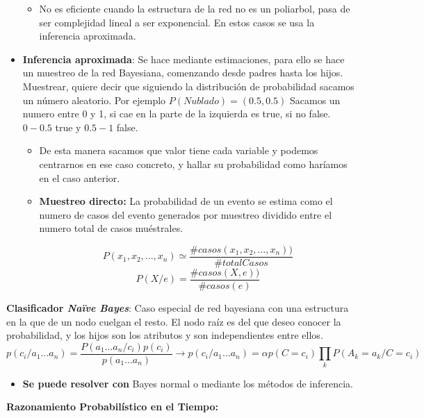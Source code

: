\documentclass[12pt, twoside, openright]{report} %
\begin{document}
\begin{itemize}
\begin{itemize}
    \item No es eficiente cuando la estructura de la red no es un poliarbol,
      pasa de ser complejidad lineal a ser exponencial. En estos casos
      se usa la inferencia aproximada.
      
    \end{itemize}
  \item \textbf{Inferencia aproximada}: Se hace mediante estimaciones, para
    ello se hace un muestreo de la red Bayesiana, comenzando desde
    padres hasta los hijos. Muestrear, quiere decir que siguiendo la
    distribución de probabilidad sacamos un número aleatorio. Por
    ejemplo $P(Nublado)=(0.5, 0.5)$ Sacamos un numero entre 0 y 1, si cae
    en la parte de la izquierda es true, si no false. $0-0.5$ true y $0.5-1$
    false.
    

    \begin{itemize}
    \item De esta manera sacamos que valor tiene cada variable y podemos
      centrarnos en ese caso concreto, y hallar su probabilidad como
      haríamos en el caso anterior.
      
    \item \textbf{Muestreo directo:} La probabilidad de un evento se estima
      como el numero de casos del evento generados por muestreo dividido
      entre el numero total de casos muéstrales.
      
	  $$P(x_1, x_2, ..., x_n) \simeq \frac{\#casos(x_1, x_2, ..., x_n))}{\#total Casos}$$
	  $$P(X/e) = \frac{\#casos(X, e))}{\#casos(e)}$$

    \end{itemize}
  \end{itemize}

 
  \textbf{Clasificador \emph{Naïve Bayes}}: Caso especial de red
  bayesiana con una estructura en la que de un nodo cuelgan el resto. El
  nodo raíz es del que deseo conocer la probabilidad, y los hijos son
  los atributos y son independientes entre ellos.
  $$p(c_i/a_1 ... a_n)= \frac{P(a_1 ... a_n / c_i)p(c_i)}{p(a_1 ... a_n)} \rightarrow p(c_i/a_1 ... a_n)= \alpha p(C= c_i) \prod_k P(A_k = a_k / C= c_i)$$
  \begin{itemize}
  \item \textbf{Se puede resolver con} Bayes normal o mediante los métodos
    de inferencia.
    
  \end{itemize}

  


  \textbf{Razonamiento Probabilístico en el Tiempo:}
\end{document}
